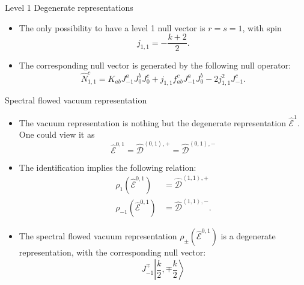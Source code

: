 \documentclass{beamer}
\newcommand{\ket}[1]{\left| #1 \right\rangle}
\newcommand{\vev}[1]{\left\langle #1 \right\rangle}
\begin{document}
\begin{frame}{Level 1 Degenerate representations}
  \begin{itemize}
    \item The only possibility to have a level 1 null vector is $r = s = 1$, with spin 
        \begin{equation}
            j_{1,1} = - \frac{k+2}{2}.
        \end{equation}
    \item The corresponding null vector is generated by the following null operator:
      \begin{equation}
          \hat{N}^{c}_{1,1} = K_{ab} J^{a}_{-1} J^{b}_{0} J^{c}_{0} + j_{1,1} f^{c}_{ab} J^{a}_{-1} J^{b}_{0} - 2 j^{2}_{1,1} J^{c}_{-1}. \label{nullvector}
      \end{equation}
  \end{itemize}
\end{frame}

\begin{frame}{Spectral flowed vacuum representation}
  \begin{itemize}
    \item The vacuum representation is nothing but the degenerate representation $\widehat{\mathcal{E}}^{1}$. One could view it as 
      \begin{equation}
          \hat{\mathcal{E}}^{0,1} = \hat{\mathcal{D}}^{\vev{0,1},+} = \hat{\mathcal{D}}^{\vev{0,1},-}
      \end{equation}
    \item The identification implies the following relation: 
      \begin{equation}
          \begin{aligned}
              \rho_{1} \left(\hat{\mathcal{E}}^{0,1}\right) &= \hat{\mathcal{D}}^{\vev{1,1},+}\\
              \rho_{-1} \left(\hat{\mathcal{E}}^{0,1}\right) &= \hat{\mathcal{D}}^{\vev{1,1},-}.
          \end{aligned}
      \end{equation}
    \item The spectral flowed vacuum representation $\rho_{\pm} \left(\hat{\mathcal{E}}^{0,1}\right)$ is a 
    degenerate representation, with the corresponding null vector:
      \begin{equation}
        J^{\mp}_{-1} \ket{\frac{k}{2},\mp \frac{k}{2}}
      \end{equation}
  \end{itemize}
\end{frame}
\end{document}
